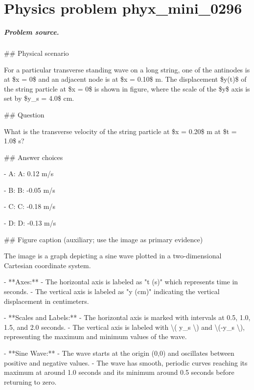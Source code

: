 
\chapter{Physics problem phyx\_mini\_0296}
\label{ch:PhyXMiniProblems_problem_phyx_mini_0296}

\paragraph{Problem source.}
\#\# Physical scenario

For a particular transverse standing wave on a long string, one of the antinodes is at \$x = 0\$ and an adjacent node is at \$x = 0.10\$ m. The displacement \$y(t)\$ of the string particle at \$x = 0\$ is shown in figure, where the scale of the \$y\$ axis is set by \$y\_s = 4.0\$ cm.

\#\# Question

What is the transverse velocity of the string particle at \$x = 0.20\$ m at \$t = 1.0\$ s?

\#\# Answer choices

- A: A: 0.12 m/s

- B: B: -0.05 m/s

- C: C: -0.18 m/s

- D: D: -0.13 m/s

\#\# Figure caption (auxiliary; use the image as primary evidence)

The image is a graph depicting a sine wave plotted in a two-dimensional Cartesian coordinate system. 

- **Axes:**
  - The horizontal axis is labeled as "t (s)" which represents time in seconds.
  - The vertical axis is labeled as "y (cm)" indicating the vertical displacement in centimeters.

- **Scales and Labels:**
  - The horizontal axis is marked with intervals at 0.5, 1.0, 1.5, and 2.0 seconds.
  - The vertical axis is labeled with \textbackslash{}( y\_s \textbackslash{}) and \textbackslash{}(-y\_s \textbackslash{}), representing the maximum and minimum values of the wave.

- **Sine Wave:**
  - The wave starts at the origin (0,0) and oscillates between positive and negative values.
  - The wave has smooth, periodic curves reaching its maximum at around 1.0 seconds and its minimum around 0.5 seconds before returning to zero.

